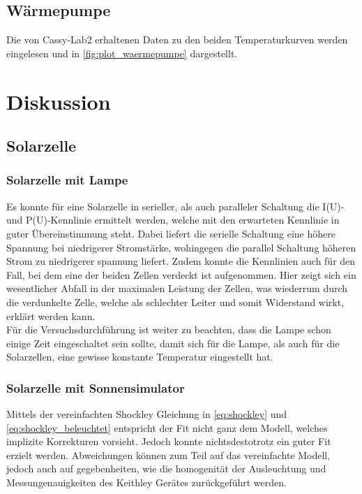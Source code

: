 \documentclass[english, ngerman]{scrartcl}
\begin{document}
\subsection{Wärmepumpe}
\label{subsec:auswertung_waermepumpe}

Die von Cassy-Lab2 erhaltenen Daten zu den beiden Temperaturkurven werden eingelesen und in \autoref{fig:plot_waermepumpe} dargestellt.



\section{Diskussion}
\subsection{Solarzelle}
\label{subsec:diskussion_solar}
\subsubsection{Solarzelle mit Lampe}
\label{subsubsec:diskussion_solar_lampe}
Es konnte für eine Solarzelle in serieller, als auch paralleler Schaltung die I(U)- und P(U)-Kennlinie ermittelt werden, welche mit den erwarteten Kennlinie in guter Übereinstimmung steht. Dabei liefert die serielle Schaltung eine höhere Spannung bei niedrigerer Stromstärke, wohingegen die parallel Schaltung höheren Strom zu niedrigerer spannung liefert. Zudem konnte die Kennlinien auch für den Fall, bei dem eine der beiden Zellen verdeckt ist aufgenommen. Hier zeigt sich ein wesentlicher Abfall in der maximalen Leistung der Zellen, was wiederrum durch die verdunkelte Zelle, welche als schlechter Leiter und somit Widerstand wirkt, erklärt werden kann. \\
%
Für die Versuchsdurchführung ist weiter zu beachten, dass die Lampe schon einige Zeit eingeschaltet sein sollte, damit sich für die Lampe, als auch für die Solarzellen, eine gewisse konstante Temperatur eingestellt hat.\\
%
\subsubsection{Solarzelle mit Sonnensimulator}
\label{subsubsec:diskussion_solar_sonnensimulator}
Mittels der vereinfachten Shockley Gleichung in \ref{eq:shockley} und \ref{eq:shockley_beleuchtet} entspricht der Fit nicht ganz dem Modell, welches implizite Korrekturen vorsieht. Jedoch konnte nichtsdestotrotz ein guter Fit erzielt werden. Abweichungen können zum Teil auf das vereinfachte Modell, jedoch auch auf gegebenheiten, wie die homogenität der Ausleuchtung und Messungenauigkeiten des Keithley Gerätes zurückgeführt werden.\\
\end{document}
